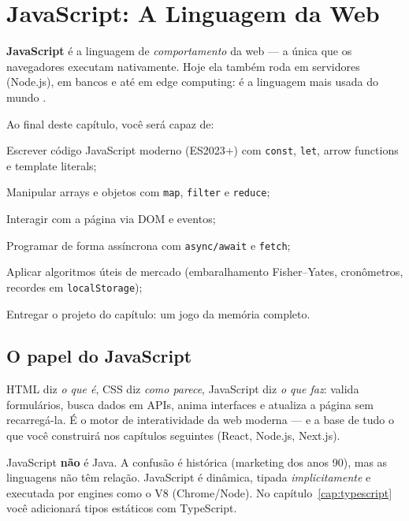 \chapter{JavaScript: A Linguagem da Web}
\label{cap:js}

\begin{caixaconceito}
\textbf{JavaScript} é a linguagem de \emph{comportamento} da web — a única que
os navegadores executam nativamente. Hoje ela também roda em servidores
(Node.js), em bancos e até em edge computing: é a linguagem mais usada do
mundo \cite{so2025}.
\end{caixaconceito}

Ao final deste capítulo, você será capaz de:
\begin{objetivos}
  \item Escrever código JavaScript moderno (ES2023+) com \texttt{const}, \texttt{let}, arrow functions e template literals;
  \item Manipular arrays e objetos com \texttt{map}, \texttt{filter} e \texttt{reduce};
  \item Interagir com a página via DOM e eventos;
  \item Programar de forma assíncrona com \texttt{async/await} e \texttt{fetch};
  \item Aplicar algoritmos úteis de mercado (embaralhamento Fisher--Yates, cronômetros, recordes em \texttt{localStorage});
  \item Entregar o projeto do capítulo: um jogo da memória completo.
\end{objetivos}

\section{O papel do JavaScript}

HTML diz \emph{o que é}, CSS diz \emph{como parece}, JavaScript diz \emph{o que
faz}: valida formulários, busca dados em APIs, anima interfaces e atualiza a
página sem recarregá-la. É o motor de interatividade da web moderna — e a base
de tudo o que você construirá nos capítulos seguintes (React, Node.js, Next.js).

\begin{caixadica}
JavaScript \textbf{não} é Java. A confusão é histórica (marketing dos anos 90),
mas as linguagens não têm relação. JavaScript é dinâmica, tipada
\emph{implicitamente} e executada por engines como o V8 (Chrome/Node). No
capítulo~\ref{cap:typescript} você adicionará tipos estáticos com TypeScript.
\end{caixadica}

